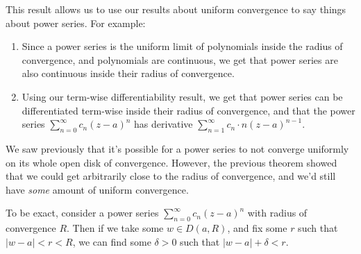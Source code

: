\documentclass[a4paper]{scrartcl}
\begin{document}
This result allows us to use our results about uniform convergence to say things about power series. For example:

\begin{enumerate}
    \item Since a power series is the uniform limit of polynomials inside the radius of convergence, and polynomials are continuous, we get that power series are also continuous inside their radius of convergence.
    \item Using our term-wise differentiability result, we get that power series can be differentiated term-wise inside their radius of convergence, and that the power series $\sum_{n = 0}^{\infty} c_n(z - a)^n$ has derivative $\sum_{n = 1}^{\infty} c_n \cdot n (z - a)^{n - 1}$. 
\end{enumerate} 

We saw previously that it's possible for a power series to not converge uniformly on its whole open disk of convergence. However, the previous theorem showed that we could get arbitrarily close to the radius of convergence, and we'd still have \emph{some} amount of uniform convergence.

To be exact, consider a power series $\sum_{n = 0}^{\infty} c_n(z - a)^n$ with radius of convergence $R$. Then if we take some $w \in D(a, R)$, and fix some $r$ such that $|w - a| < r < R$, we can find some $\delta > 0$ such that $|w - a| + \delta < r$.
\end{document}
